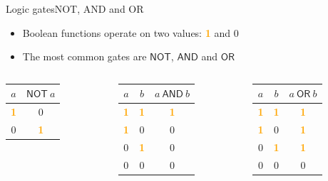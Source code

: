 \documentclass{beamer}
\newcommand{\on}[0]{\textcolor{orange}{\bf 1}\xspace}
\newcommand{\off}[0]{0\xspace}
\begin{document}
\begin{frame}{Logic gates}{NOT, AND and OR}
	\pause
	\begin{itemize}
		\item Boolean functions operate on two values: \on and \off
		\item The most common gates are $\mathsf{NOT}$, $\mathsf{AND}$ and $\mathsf{OR}$
	\end{itemize}

	\bigskip
	\begin{columns}[onlytextwidth]
		\begin{column}{0.2\textwidth}
			\centering
			\begin{tabular}{c|c}
				$a$ & $\mathsf{NOT}~ a$ \\
				\hline
				\on & \off \\
				\off & \on
			\end{tabular}
		\end{column}

		\begin{column}{0.3\textwidth}
			\centering
			\begin{tabular}{c|c|c}
				$a$ & $b$ & $a ~\mathsf{AND}~ b$ \\
				\hline
				\on & \on & \on \\
				\on & \off & \off \\
				\off & \on & \off \\
				\off & \off & \off
			\end{tabular}
		\end{column}

		\begin{column}{0.3\textwidth}
			\centering
			\begin{tabular}{c|c|c}
				$a$ & $b$ & $a ~\mathsf{OR}~ b$ \\
				\hline
				\on & \on & \on \\
				\on & \off & \on \\
				\off & \on & \on \\
				\off & \off & \off
			\end{tabular}
		\end{column}
	\end{columns}

\end{frame}
\end{document}
